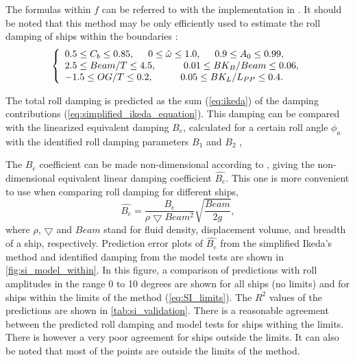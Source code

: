 \noindent The formulas within $f$ can be referred to \parencite{ikeda_velocity_1979, kawahara_simple_2011} with the implementation in \cite{alexandersson_martinlarsalbertrolldecay-estimators_2020}.
It should be noted that this method may be only efficiently used to estimate the roll damping of ships within the boundaries \parencite{kawahara_simple_2011}:
\begin{equation}
    \label{eq:SI_limits}
     \left\{
     \begin{array}{ll}
    0.5 \leq C_b \leq 0.85,\hspace{0.5cm} 
    0 \leq \hat{\omega} \leq 1.0,
    \hspace{0.5cm}
    0.9 \leq A_0 \leq 0.99,\\
    2.5\leq Beam/T \leq 4.5, \hspace{1cm}
    0.01 \leq BK_B/Beam \leq 0.06, \\
        -1.5 \leq OG/T \leq 0.2,
     \hspace{1cm}
    0.05 \leq BK_L/L_{PP} \leq 0.4.
    \end{array}
    \right.
\end{equation}

\noindent The total roll damping is predicted as the sum (\autoref{eq:ikeda}) of the damping contributions (\autoref{eq:simplified_ikeda_equation}). This damping can be compared with the linearized equivalent damping $B_e$, calculated for a certain roll angle $\phi_a$ with the identified roll damping parameters $B_1$ and $B_2$ \cite{himeno_prediction_1981},


\noindent The $B_e$ coefficient can be made non-dimensional according to \parencite{himeno_prediction_1981}, giving the non-dimensional equivalent linear damping coefficient $\hat{B_e}$. This one is more convenient to use when comparing roll damping for different ships,
\begin{equation} \label{eq:be_eqvalent}
    \hat{B_e} = \frac{B_e}{\rho \bigtriangledown Beam^2} \sqrt{\frac{Beam}{2g}},
\end{equation}
\noindent where $\rho$, $\bigtriangledown$ and $Beam$ stand for fluid density, displacement volume, and breadth of a ship, respectively. Prediction error plots of $\hat{B_e}$ from the simplified Ikeda's method and identified damping from the model tests are shown in \autoref{fig:si_model_within}. In this figure, a comparison of predictions with roll amplitudes in the range 0 to 10 degrees are shown for all ships (no limits) and for ships within the limits of the method (\autoref{eq:SI_limits}). The $R^2$ values of the predictions are shown in \autoref{tab:si_validation}. There is a reasonable agreement between the predicted roll damping and model tests for ships withing the limits. There is however a very poor agreement for ships outside the limits. It can also be noted that most of the points are outside the limits of the method.

